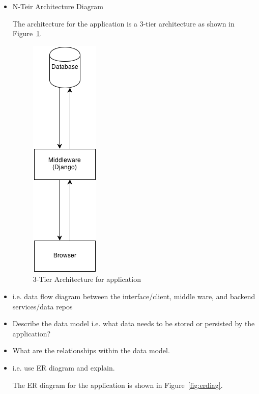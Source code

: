 \documentclass{sig-alt-release2}
\begin{document}
\begin{itemize}
\item	N-Teir Architecture Diagram

The architecture for the application is a 3-tier architecture as shown
in Figure~\ref{fig:ntier}.

\begin{figure}
\centering
\includegraphics{../imgs/N-TierArchitecture.png}
\caption{3-Tier Architecture for application}
\label{fig:ntier}
\end{figure}

\item	i.e. data flow diagram between the interface/client, middle ware,
and backend services/data repos


\item	Describe the data model i.e. what data needs to be stored or
persisted by the application?



\item	What are the relationships within the data model.
\item	i.e. use ER diagram and explain.

The ER diagram for the application is shown in Figure~\ref{fig:erdiag}.


\end{itemize}
\end{document}
